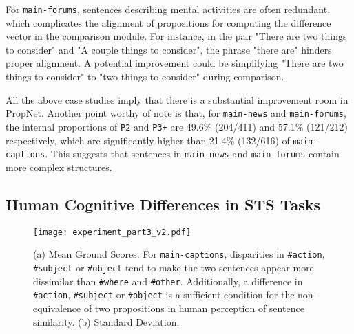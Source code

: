 For \texttt{main-forums}, sentences describing mental activities are often redundant, which complicates the alignment of propositions for computing the difference vector in the comparison module. For instance, in the pair "There are two things to consider" and "A couple things to consider", the phrase "there are" hinders proper alignment. A potential improvement could be simplifying "There are two things to consider" to "two things to consider" during comparison. 

All the above case studies imply that there is a substantial improvement room in PropNet. Another point worthy of note is that, for \texttt{main-news} and \texttt{main-forums}, the internal proportions of \texttt{P2} and \texttt{P3+} are 49.6\% (204/411) and 57.1\% (121/212) respectively, which are significantly higher than 21.4\% (132/616) of \texttt{main-captions}. This suggests that sentences in \texttt{main-news} and \texttt{main-forums} contain more complex structures.



\subsection{Human Cognitive Differences in STS Tasks}
\label{cog_diff_in_sts}

\begin{figure*}[h]
  \centering
  \texttt{[image: experiment\_part3\_v2.pdf]}
  \caption{(a) Mean Ground Scores. For \texttt{main-captions}, disparities in \texttt{\#action}, \texttt{\#subject} or \texttt{\#object} tend to make the two sentences appear more dissimilar than \texttt{\#where} and \texttt{\#other}. Additionally, a difference in \texttt{\#action}, \texttt{\#subject} or \texttt{\#object} is a sufficient condition for the non-equivalence of two propositions in human perception of sentence similarity. (b) Standard Deviation.}
  \label{fig:cap_vs_news}
\end{figure*}



